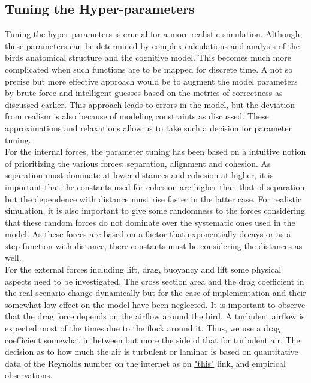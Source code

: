 \documentclass{article}
\begin{document}
\pagebreak

\subsection{Tuning the Hyper-parameters}

Tuning the hyper-parameters is crucial for a more realistic simulation. Although, these parameters can be determined by complex calculations and analysis of the birds anatomical structure and the cognitive model. This becomes much more complicated when such functions are to be mapped for discrete time. A not so precise but more effective approach would be to augment the model parameters by brute-force and intelligent guesses based on the metrics of correctness as discussed earlier. This approach leads to errors in the model, but the deviation from realism is also because of modeling constraints as discussed. These approximations and relaxations allow us to take such a decision for parameter tuning. \\
For the internal forces, the parameter tuning has been based on a intuitive notion of prioritizing the various forces: separation, alignment and cohesion. As separation must dominate at lower distances and cohesion at higher, it is important that the constants used for cohesion are higher than that of separation but the dependence with distance must rise faster in the latter case. For realistic simulation, it is also important to give some randomness to the forces considering that these random forces do not dominate over the systematic ones used in the model. As these forces are based on a factor that exponentially decays or as a step function with distance, there constants must be considering the distances as well. \\
For the external forces including lift, drag, buoyancy and lift some physical aspects need to be investigated. The cross section area and the drag coefficient in the real scenario change dynamically but for the ease of implementation and their somewhat low effect on the model have been neglected. It is important to observe that the drag force depends on the airflow around the bird. A turbulent airflow is expected most of the times due to the flock around it. Thus, we use a drag coefficient somewhat in between but more the side of that for turbulent air. The decision as to how much the air is turbulent or laminar is based on quantitative data of the Reynolds number on the internet as on \href{https://aip.scitation.org/doi/abs/10.1063/1.4807064}{"this"}  link, and empirical observations. 
\end{document}
